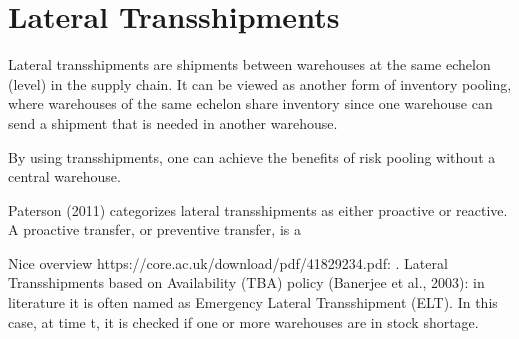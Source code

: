 \documentclass[../../main.tex]{subfiles}
\begin{document}

\section{Lateral Transshipments}

Lateral transshipments are shipments between warehouses at the same echelon (level) in the supply chain. It can be viewed as another form of inventory pooling, where warehouses of the same echelon share inventory since one warehouse can send a shipment that is needed in another warehouse. 

By using transshipments, one can achieve the benefits of risk pooling without a central warehouse.

Paterson (2011) categorizes lateral transshipments as either proactive or reactive. A proactive transfer, or preventive transfer, is a 

Nice overview https://core.ac.uk/download/pdf/41829234.pdf:
. Lateral Transshipments based on Availability (TBA) policy (Banerjee et al., 2003): in literature it is often named as Emergency Lateral Transshipment (ELT). In this case, at time t, it is checked if one or more warehouses are in stock shortage. 

\end{document}
